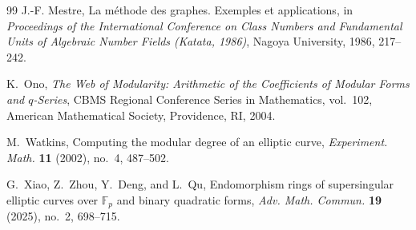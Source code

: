 \documentclass[11pt]{amsart}
\theoremstyle{definition}
\theoremstyle{remark}
\newcommand{\F}{\mathbb{F}}
\begin{document}
\begin{thebibliography}{99}
J.-F. Mestre,
La m\'ethode des graphes. Exemples et applications,
in \emph{Proceedings of the International Conference on Class Numbers and Fundamental Units of Algebraic Number Fields (Katata, 1986)},
Nagoya University, 1986, 217--242.

K.~Ono,
\emph{The Web of Modularity: Arithmetic of the Coefficients of Modular Forms and $q$-Series},
CBMS Regional Conference Series in Mathematics, vol.~102,
American Mathematical Society, Providence, RI, 2004.

M.~Watkins,
Computing the modular degree of an elliptic curve,
\emph{Experiment. Math.} \textbf{11} (2002), no.~4, 487--502.

G.~Xiao, Z.~Zhou, Y.~Deng, and L.~Qu,
Endomorphism rings of supersingular elliptic curves over $\F_p$ and binary quadratic forms,
\emph{Adv. Math. Commun.} \textbf{19} (2025), no.~2, 698--715.

\end{thebibliography}
\end{document}
